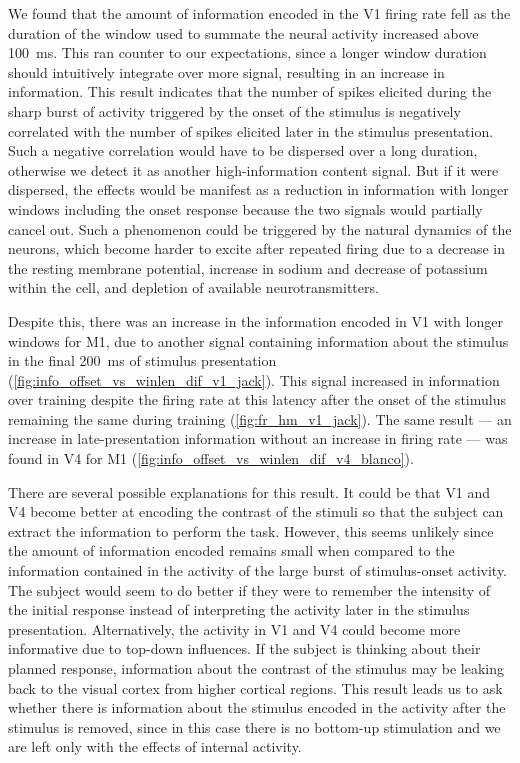 We found that the amount of information encoded in the \ac{V1} firing rate fell as the duration of the window used to summate the neural activity increased above \SI{100}{\milli\second}.
This ran counter to our expectations, since a longer window duration should intuitively integrate over more signal, resulting in an increase in information.
This result indicates that the number of spikes elicited during the sharp burst of activity triggered by the onset of the stimulus is negatively correlated with the number of spikes elicited later in the stimulus presentation.
Such a negative correlation would have to be dispersed over a long duration, otherwise we detect it as another high-information content signal.
But if it were dispersed, the effects would be manifest as a reduction in information with longer windows including the onset response because the two signals would partially cancel out.
Such a phenomenon could be triggered by the natural dynamics of the neurons, which become harder to excite after repeated firing due to a decrease in the resting membrane potential, increase in sodium and decrease of potassium within the cell, and depletion of available neurotransmitters.

Despite this, there was an increase in the information encoded in \ac{V1} with longer windows for \ac{M1}, due to another signal containing information about the stimulus in the final \SI{200}{\milli\second} of stimulus presentation (\autoref{fig:info_offset_vs_winlen_dif_v1_jack}).
This signal increased in information over training despite the firing rate at this latency after the onset of the stimulus remaining the same during training (\autoref{fig:fr_hm_v1_jack}).
The same result --- an increase in late-presentation information without an increase in firing rate --- was found in \ac{V4} for \ac{M1} (\autoref{fig:info_offset_vs_winlen_dif_v4_blanco}).

There are several possible explanations for this result.
It could be that \ac{V1} and \ac{V4} become better at encoding the contrast of the stimuli so that the subject can extract the information to perform the task.
However, this seems unlikely since the amount of information encoded remains small when compared to the information contained in the activity of the large burst of stimulus-onset activity.
The subject would seem to do better if they were to remember the intensity of the initial response instead of interpreting the activity later in the stimulus presentation.
Alternatively, the activity in \ac{V1} and \ac{V4} could become more informative due to top-down influences.
If the subject is thinking about their planned response, information about the contrast of the stimulus may be leaking back to the visual cortex from higher cortical regions.
This result leads us to ask whether there is information about the stimulus encoded in the activity after the stimulus is removed, since in this case there is no bottom-up stimulation and we are left only with the effects of internal activity.

